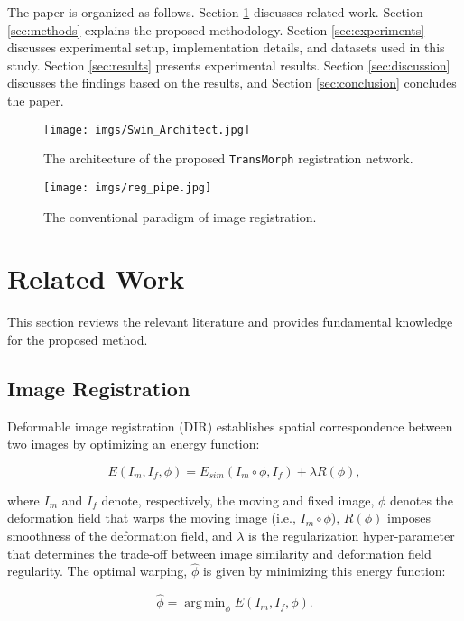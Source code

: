 \documentclass[times,twocolumn,final]{elsarticle}
\DeclareMathOperator*{\argmin}{arg\,min}
\begin{document}
The paper is organized as follows. Section \ref{sec:rel_work} discusses related work. Section \ref{sec:methods} explains the proposed methodology. Section \ref{sec:experiments} discusses experimental setup, implementation details, and datasets used in this study. Section \ref{sec:results} presents experimental results. Section \ref{sec:discussion} discusses the findings based on the results, and Section \ref{sec:conclusion} concludes the paper. \begin{figure*}[!t]
\centering
\texttt{[image: imgs/Swin\_Architect.jpg]}
\caption{The architecture of the proposed \texttt{TransMorph} registration network.\label{fig:net_arch}}
\end{figure*}

\begin{figure}[!h]
\centering
\texttt{[image: imgs/reg\_pipe.jpg]}
\caption{The conventional paradigm of image registration.\label{fig:reg_pipe}}
\end{figure}

\section{Related Work}
\label{sec:rel_work}
This section reviews the relevant literature and provides fundamental knowledge for the proposed method.

\subsection{Image Registration}
Deformable image registration (DIR) establishes spatial correspondence between two images by optimizing an energy function:
\begin{linenomath}
\begin{equation}
\label{eqn:E}
    E(I_m, I_f, \phi) = E_{sim}(I_m\circ\phi, I_f) + \lambda R(\phi), 
\end{equation}
\end{linenomath}
where $I_m$ and $I_f$ denote, respectively, the moving and fixed image, $\phi$ denotes the deformation field that warps the moving image (i.e., $I_m\circ\phi$), $R(\phi)$ imposes smoothness of the deformation field, and $\lambda$ is the regularization hyper-parameter that determines the trade-off between image similarity and deformation field regularity. The optimal warping, $\hat{\phi}$ is given by minimizing this energy function:
\begin{linenomath}
\begin{equation}
    \hat{\phi} = \argmin_\phi E(I_m, I_f, \phi).
\end{equation}
\end{linenomath}
\end{document}
